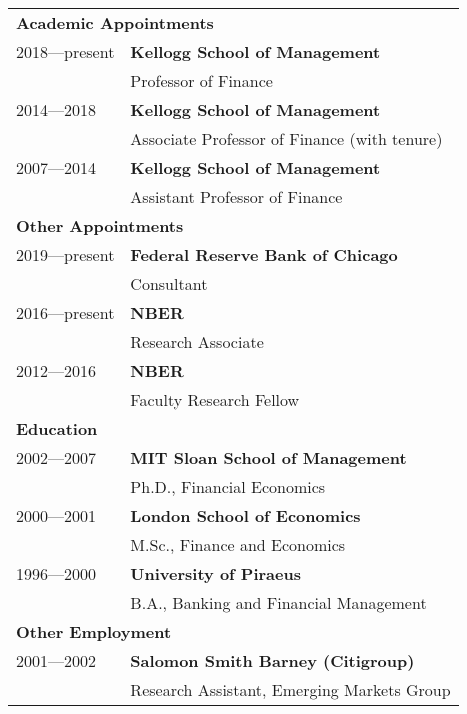 \documentclass[11pt,letterpaper,serif,overlapped]{res}
\begin{document}
\begin{resume}
\begin{tabular}{ll}\\[1cm]
\multicolumn{2}{l}{\textbf{Academic Appointments}}\\
[0.5cm]
2018---present & \textbf{Kellogg School of Management}\\
& Professor of Finance\\
2014---2018 & \textbf{Kellogg School of Management}\\
& Associate Professor of Finance (with tenure)\\
 2007---2014 & \textbf{Kellogg School of Management}\\
& Assistant Professor of Finance\\
[0.5cm]
\multicolumn{2}{l}{\textbf{Other Appointments}}\\
[0.5cm]
2019---present & \textbf{Federal Reserve Bank of Chicago}\\
& Consultant \\[0.1cm]
2016---present & \textbf{NBER  }\\
& Research Associate\\[0.1cm]
2012---2016 & \textbf{NBER }\\
& Faculty Research Fellow\\
[0.5cm]
\multicolumn{2}{l}{\textbf{Education}}\\
[0.5cm]
2002---2007 & \textbf{MIT Sloan School of Management}\\
& Ph.D., Financial Economics\\[0.1cm]
2000---2001 & \textbf{London School of Economics}\\
& M.Sc., Finance and Economics \\[0.1cm]
1996---2000 & \textbf{University of Piraeus} \\
& B.A., Banking and Financial Management\\
[0.5cm]
\multicolumn{2}{l}{\textbf{Other Employment}}\\
[0.5cm]
2001---2002 & \textbf{Salomon Smith Barney (Citigroup)}\\
& Research Assistant, Emerging Markets Group\\
\end{tabular}
\newpage


\end{resume}
\end{document}
